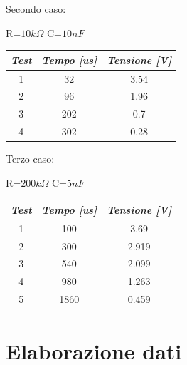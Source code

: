     \begin{center}
        Secondo caso: \par
        R=$10k\Omega$ C=$10nF$
    \end{center}
    \begin{center}
    \begin{tabular}{|c|c|c|}
        \hline
        \textit{Test} & \textit{Tempo [us]} & \textit{Tensione [V]} \\
        \hline
        1 & 32 & 3.54 \\
        \hline
        2 & 96 & 1.96 \\
        \hline
        3 & 202 & 0.7 \\
        \hline
        4 & 302 & 0.28 \\
        \hline
    
    \end{tabular}
    \end{center}

    \begin{center}
        Terzo caso: \par
        R=$200k\Omega$ C=$5nF$
    \end{center}
    \begin{center}
    \begin{tabular}{|c|c|c|}
        \hline
        \textit{Test} & \textit{Tempo [us]} & \textit{Tensione [V]} \\
        \hline
        1 & 100 & 3.69 \\
        \hline
        2 & 300 & 2.919 \\
        \hline
        3 & 540 & 2.099 \\
        \hline
        4 & 980 & 1.263 \\
        \hline
        5 & 1860 & 0.459 \\
        \hline
    
    \end{tabular}
    \end{center}

    \section{Elaborazione dati}

    

